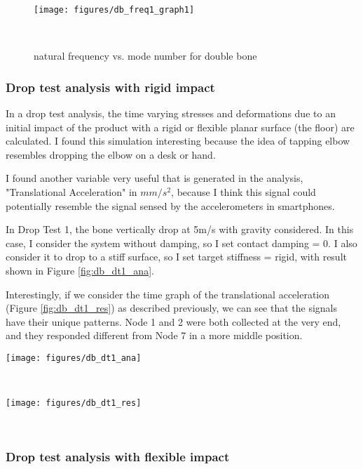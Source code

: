 \documentclass{sigchi}
\begin{document}
\begin{figure}
\centering
  \texttt{[image: figures/db\_freq1\_graph1]}
  \caption{natural frequency vs. mode number for double bone}~\label{fig:db_freq1_graph1}
\end{figure}


\subsubsection{Drop test analysis with rigid impact}

In a drop test analysis, the time varying stresses and deformations due to an initial impact of the product with a rigid or flexible planar surface (the floor) are calculated. I found this simulation interesting because the idea of tapping elbow resembles dropping the elbow on a desk or hand. 

I found another variable very useful that is generated in the analysis, "Translational Acceleration" in $mm/s^2$, because I think this signal could potentially resemble the signal sensed by the accelerometers in smartphones.

In Drop Test 1, the bone vertically drop at 5m/s with gravity considered. In this case, I consider the system without damping, so I set contact damping = 0. I also consider it to drop to a stiff surface, so I set target stiffness = rigid, with result shown in Figure \ref{fig:db_dt1_ana}. 

Interestingly, if we consider the time graph of the translational acceleration (Figure \ref{fig:db_dt1_res}) as described previously, we can see that the signals have their unique patterns. Node 1 and 2 were both collected at the very end, and they responded different from Node 7 in a more middle position.

\begin{figure*}
  \centering
  \texttt{[image: figures/db\_dt1\_ana]}
  \caption{analysis for Drop Test 1 for double bone in (a) stress, (b) displacement and (c) strain.}
    ~\label{fig:db_dt1_ana}
\end{figure*}

\begin{figure*}
  \centering
  \texttt{[image: figures/db\_dt1\_res]}
  \caption{response graphs for Drop Test 1 for double bone in three different location (nodes).}
    ~\label{fig:db_dt1_res}
\end{figure*}

\subsubsection{Drop test analysis with flexible impact}
\end{document}
